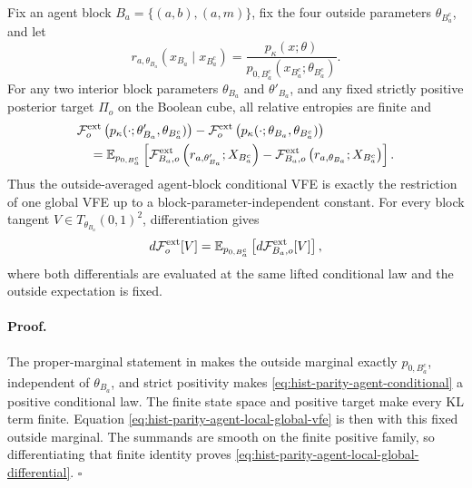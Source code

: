 Fix an agent block \(B_a=\{(a,b),(a,m)\}\), fix the four outside
parameters \(\theta_{B_a^c}\), and let
\begin{equation}
r_{a,\theta_{B_a}}(x_{B_a}\mid x_{B_a^c})
=\frac{p_\kappa(x;\theta)}
{p_{0,B_a^c}(x_{B_a^c};\theta_{B_a^c})}.
\label{eq:hist-parity-agent-conditional}
\end{equation}
For any two interior block parameters \(\theta_{B_a}\) and
\(\theta'_{B_a}\), and any fixed strictly positive posterior target
\(\Pi_o\) on the Boolean cube, all relative entropies are finite and
\begin{align}
&\mathcal F_o^{\rm ext}
\left(p_\kappa(\mathord{\cdot};\theta'_{B_a},\theta_{B_a^c})\right)
-\mathcal F_o^{\rm ext}
\left(p_\kappa(\mathord{\cdot};\theta_{B_a},\theta_{B_a^c})\right)
\notag\\
&\quad
=\mathbb E_{p_{0,B_a^c}}\left[
\mathcal F_{B_a,o}^{\rm ext}
\left(r_{a,\theta'_{B_a}};X_{B_a^c}\right)
-\mathcal F_{B_a,o}^{\rm ext}
\left(r_{a,\theta_{B_a}};X_{B_a^c}\right)
\right].
\label{eq:hist-parity-agent-local-global-vfe}
\end{align}
Thus the outside-averaged agent-block conditional VFE is exactly the
restriction of one global VFE up to a block-parameter-independent constant.
For every block tangent \(V\in T_{\theta_{B_a}}(0,1)^2\), differentiation
gives
\begin{equation}
d\mathcal F_o^{\rm ext}[V]
=\mathbb E_{p_{0,B_a^c}}\left[
d\mathcal F_{B_a,o}^{\rm ext}[V]
\right],
\label{eq:hist-parity-agent-local-global-differential}
\end{equation}
where both differentials are evaluated at the same lifted conditional law
and the outside expectation is fixed.

\paragraph{Proof.}
The proper-marginal statement in
 makes the outside marginal exactly
\(p_{0,B_a^c}\), independent of \(\theta_{B_a}\), and strict positivity
makes \eqref{eq:hist-parity-agent-conditional} a positive conditional law.
The finite state space and positive target make every KL term finite.
Equation \eqref{eq:hist-parity-agent-local-global-vfe} is then
 with this fixed outside marginal.
The summands are smooth on the finite positive family, so differentiating
that finite identity proves
\eqref{eq:hist-parity-agent-local-global-differential}.
\(\square\)

